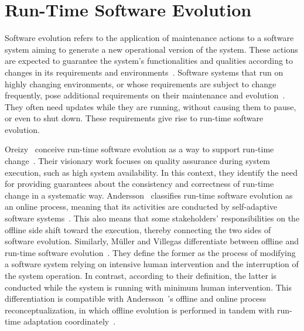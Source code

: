 
\section{Run-Time Software Evolution}
\label{sect:background--run-time-software-evolution}

Software evolution refers to the application of maintenance actions to a software system aiming to generate a new operational version of the system. These actions are expected to guarantee the system's functionalities and qualities according to changes in its requirements and environments~\cite{chapin-2001-types,muller-2014-highly}. Software systems that run on highly changing environments, or whose requirements are subject to change frequently, pose additional requirements on their maintenance and evolution~\cite{mens-2005-challenges}. They often need updates while they are running, without causing them to pause, or even to shut down. These requirements give rise to run-time software evolution.

Oreizy~\etal{} conceive run-time software evolution as a way to support run-time change~\cite{oreizy-1998-architecture}. Their visionary work focuses on quality assurance during system execution, such as high system availability. In this context, they identify the need for providing guarantees about the consistency and correctness of run-time change in a systematic way. Andersson~\etal{} classifies run-time software evolution as an online process, meaning that its activities are conducted by self-adaptive software systems~\cite{andersson-2013-software}. This also means that some stakeholders' responsibilities on the offline side shift toward the execution, thereby connecting the two sides of software evolution. Similarly, M\"{u}ller and Villegas differentiate between offline and run-time software evolution~\cite{muller-2014-highly}. They define the former as the process of modifying a software system relying on intensive human intervention and the interruption of the system operation. In contrast, according to their definition, the latter is conducted while the system is running with minimum human intervention. This differentiation is compatible with Andersson~\etal{}'s offline and online process reconceptualization, in which offline evolution is performed in tandem with run-time adaptation coordinately~\cite{andersson-2013-software}.

